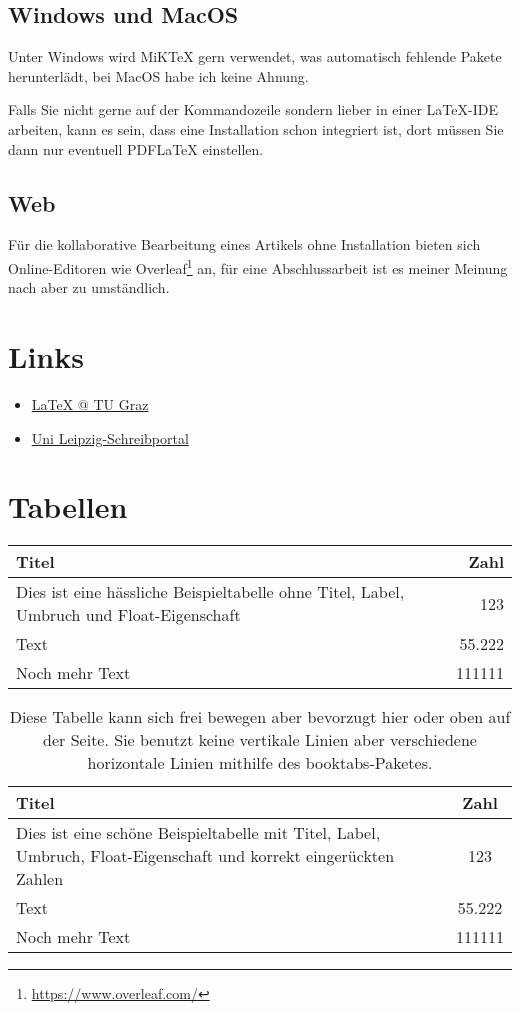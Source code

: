 \subsection{Windows und MacOS}

Unter Windows wird MiK\TeX{} gern verwendet, was automatisch fehlende Pakete herunterlädt, bei MacOS habe ich keine Ahnung.

Falls Sie nicht gerne auf der Kommandozeile sondern lieber in einer \LaTeX{}-IDE arbeiten, kann es sein, dass eine Installation schon integriert ist, dort müssen Sie dann nur eventuell PDF\LaTeX{} einstellen.

\subsection{Web}
Für die kollaborative Bearbeitung eines Artikels ohne Installation bieten sich Online-Editoren wie Overleaf\footnote{\url{https://www.overleaf.com/}} an, für eine Abschlussarbeit ist es meiner Meinung nach aber zu umständlich.

\section{Links}

\begin{itemize}
\item \href{https://latex.tugraz.at/}{\LaTeX{} @ TU Graz}
\item \href{https://home.uni-leipzig.de/schreibportal/}{Uni Leipzig-Schreibportal}
\end{itemize}

\section{Tabellen}

\begin{tabular}{|l|r|}
\hline
Titel									&Zahl\\
\hline
Dies ist eine hässliche Beispieltabelle	ohne Titel, Label, Umbruch und Float-Eigenschaft &123\\
Text									&55.222\\
Noch mehr Text							&111111\\
\hline
\end{tabular}

\begin{table}[ht]
\begin{tabulary}{\textwidth}{LS}
\toprule
Titel									&Zahl\\
\midrule
Dies ist eine schöne Beispieltabelle mit Titel, Label, Umbruch, Float-Eigenschaft und korrekt eingerückten Zahlen	&123\\
Text																												&55.222\\
Noch mehr Text																										&111111\\
\bottomrule
\end{tabulary}
\caption{Diese Tabelle kann sich frei bewegen aber bevorzugt hier oder oben auf der Seite. Sie benutzt keine vertikale Linien aber verschiedene horizontale Linien mithilfe des booktabs-Paketes.}
\label{tab:exampletable}
\end{table}


